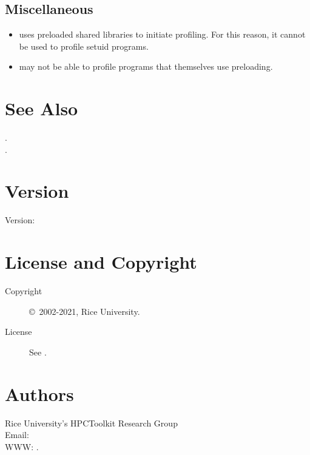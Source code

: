 \documentclass[english]{article}
\begin{document}
\subsection{Miscellaneous}

\begin{itemize}
  \item {} uses preloaded shared libraries to initiate profiling.  For this reason, it cannot be used to profile setuid programs.
  \item {} may not be able to profile programs that themselves use preloading.
\end{itemize}


\section{See Also}

.\\
.


\section{Version}

Version: \Version

\section{License and Copyright}

\begin{description}
\item[Copyright] \copyright\ 2002-2021, Rice University.
\item[License] See .
\end{description}

\section{Authors}

\noindent
Rice University's HPCToolkit Research Group \\
Email:  \\
WWW: .

\LatexManEnd
\end{document}

